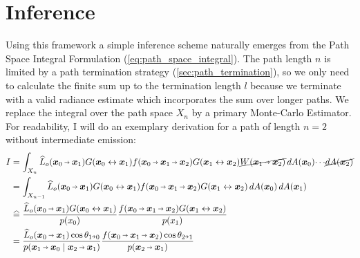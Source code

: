\section{Inference}
\label{sec:inference}
Using this framework a simple inference scheme naturally emerges from the Path Space Integral Formulation (\autoref{eq:path_space_integral}).
The path length $n$ is limited by a path termination strategy (\autoref{sec:path_termination}), so we only need to calculate the finite sum up to the termination length $l$ because we terminate with a valid radiance estimate which incorporates the sum over longer paths.
We replace the integral over the path space $X_n$ by a primary Monte-Carlo Estimator.
For readability, I will do an exemplary derivation for a path of length $n=2$ without intermediate emission:
\begin{subequations}
\begin{align}
    I
    &= \int_{X_n} \widehat{L}_o(\pdir{0}{1}) \G{0}{1} \f{0}{1}{2} \G{1}{2} \cancel{W(\pdir{1}{2})} \diff A(\vec{x}_0) \!\cdots\! \cancel{\diff A(\vec{x}_2)}\notag\\
    &= \int_{X_{n-1}} \widehat{L}_o(\pdir{0}{1}) \G{0}{1} \f{0}{1}{2} \G{1}{2} \diff A(\vec{x}_0) \diff A(\vec{x}_1) \label{eq:cancelw}\\
    &\eqhat \frac{\widehat{L}_o(\pdir{0}{1}) \G{0}{1}}{p(x_0)}  \frac{\f{0}{1}{2} \G{1}{2}}{p(x_1)} \label{eq:pmc}\\
    &= \frac{\widehat{L}_o(\pdir{0}{1}) \cos\theta_{1\veryshortarrow0}}{p(\pdir{1}{0}\mid\pdir{2}{1})}  \frac{\f{0}{1}{2} \cos\theta_{2\veryshortarrow1}}{p(\pdir{2}{1})} \label{eq:area2solid}
\end{align} %
\end{subequations}
